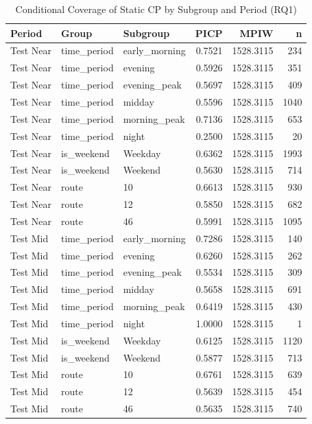 \begin{table}
\caption{Conditional Coverage of Static CP by Subgroup and Period (RQ1)}
\label{tab:t4_3_conditional_coverage}
\begin{tabular}{lllrrr}
\toprule
Period & Group & Subgroup & PICP & MPIW & n \\
\midrule
Test Near & time_period & early_morning & 0.7521 & 1528.3115 & 234 \\
Test Near & time_period & evening & 0.5926 & 1528.3115 & 351 \\
Test Near & time_period & evening_peak & 0.5697 & 1528.3115 & 409 \\
Test Near & time_period & midday & 0.5596 & 1528.3115 & 1040 \\
Test Near & time_period & morning_peak & 0.7136 & 1528.3115 & 653 \\
Test Near & time_period & night & 0.2500 & 1528.3115 & 20 \\
Test Near & is_weekend & Weekday & 0.6362 & 1528.3115 & 1993 \\
Test Near & is_weekend & Weekend & 0.5630 & 1528.3115 & 714 \\
Test Near & route & 10 & 0.6613 & 1528.3115 & 930 \\
Test Near & route & 12 & 0.5850 & 1528.3115 & 682 \\
Test Near & route & 46 & 0.5991 & 1528.3115 & 1095 \\
Test Mid & time_period & early_morning & 0.7286 & 1528.3115 & 140 \\
Test Mid & time_period & evening & 0.6260 & 1528.3115 & 262 \\
Test Mid & time_period & evening_peak & 0.5534 & 1528.3115 & 309 \\
Test Mid & time_period & midday & 0.5658 & 1528.3115 & 691 \\
Test Mid & time_period & morning_peak & 0.6419 & 1528.3115 & 430 \\
Test Mid & time_period & night & 1.0000 & 1528.3115 & 1 \\
Test Mid & is_weekend & Weekday & 0.6125 & 1528.3115 & 1120 \\
Test Mid & is_weekend & Weekend & 0.5877 & 1528.3115 & 713 \\
Test Mid & route & 10 & 0.6761 & 1528.3115 & 639 \\
Test Mid & route & 12 & 0.5639 & 1528.3115 & 454 \\
Test Mid & route & 46 & 0.5635 & 1528.3115 & 740 \\

\end{tabular}
\end{table}
